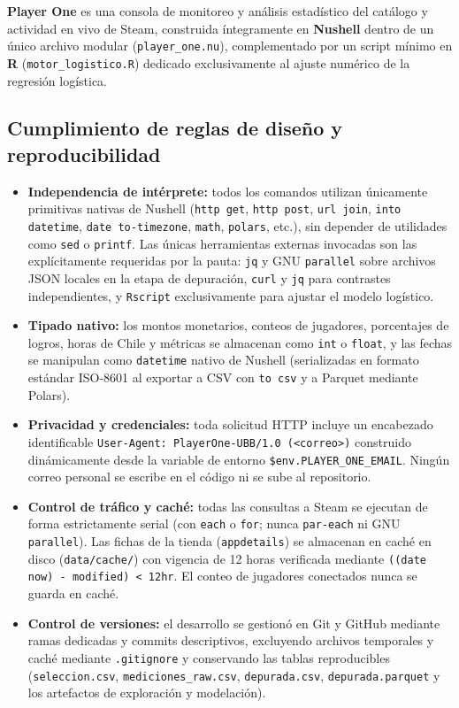 \documentclass[11pt,a4paper]{article}
\begin{document}
\textbf{Player One} es una consola de monitoreo y análisis estadístico del catálogo y actividad en vivo de Steam, construida íntegramente en \textbf{Nushell} dentro de un único archivo modular (\texttt{player\_one.nu}), complementado por un script mínimo en \textbf{R} (\texttt{motor\_logistico.R}) dedicado exclusivamente al ajuste numérico de la regresión logística.

\subsection{Cumplimiento de reglas de diseño y reproducibilidad}
\begin{itemize}
    \item \textbf{Independencia de intérprete:} todos los comandos utilizan únicamente primitivas nativas de Nushell (\texttt{http get}, \texttt{http post}, \texttt{url join}, \texttt{into datetime}, \texttt{date to-timezone}, \texttt{math}, \texttt{polars}, etc.), sin depender de utilidades como \texttt{sed} o \texttt{printf}. Las únicas herramientas externas invocadas son las explícitamente requeridas por la pauta: \texttt{jq} y GNU \texttt{parallel} sobre archivos JSON locales en la etapa de depuración, \texttt{curl} y \texttt{jq} para contrastes independientes, y \texttt{Rscript} exclusivamente para ajustar el modelo logístico.
    \item \textbf{Tipado nativo:} los montos monetarios, conteos de jugadores, porcentajes de logros, horas de Chile y métricas se almacenan como \texttt{int} o \texttt{float}, y las fechas se manipulan como \texttt{datetime} nativo de Nushell (serializadas en formato estándar ISO-8601 al exportar a CSV con \texttt{to csv} y a Parquet mediante Polars).
    \item \textbf{Privacidad y credenciales:} toda solicitud HTTP incluye un encabezado identificable \texttt{User-Agent: PlayerOne-UBB/1.0 (<correo>)} construido dinámicamente desde la variable de entorno \texttt{\$env.PLAYER\_ONE\_EMAIL}. Ningún correo personal se escribe en el código ni se sube al repositorio.
    \item \textbf{Control de tráfico y caché:} todas las consultas a Steam se ejecutan de forma estrictamente serial (con \texttt{each} o \texttt{for}; nunca \texttt{par-each} ni GNU \texttt{parallel}). Las fichas de la tienda (\texttt{appdetails}) se almacenan en caché en disco (\texttt{data/cache/}) con vigencia de 12 horas verificada mediante \texttt{((date now) - modified) < 12hr}. El conteo de jugadores conectados nunca se guarda en caché.
    \item \textbf{Control de versiones:} el desarrollo se gestionó en Git y GitHub mediante ramas dedicadas y commits descriptivos, excluyendo archivos temporales y caché mediante \texttt{.gitignore} y conservando las tablas reproducibles (\texttt{seleccion.csv}, \texttt{mediciones\_raw.csv}, \texttt{depurada.csv}, \texttt{depurada.parquet} y los artefactos de exploración y modelación).
\end{itemize}
\end{document}
